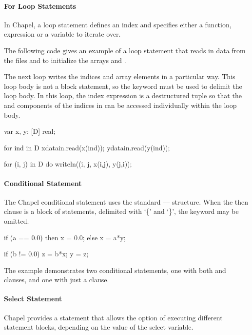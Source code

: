\paragraph{For Loop Statements} 
In Chapel, a  loop statement defines an index and
specifies either a function, expression or a variable to
iterate over. 

\begin{example}
The following code gives an example of a  loop
statement that reads in data from the files 
and  to initialize the arrays  and
.  

The next  loop writes the indices
and array elements in a particular way.  This  loop
body is not a block statement, so the keyword  must
be used to delimit the loop body.  In this loop, the index
expression is a destructured tuple so that the  and
 components of the indices in  can be accessed
individually within the loop body.    
\begin{chapel}

var x, y: [D] real;

for ind in D { 
  xdatain.read(x(ind));
  ydatain.read(y(ind));
}

for (i, j) in D do 
  writeln((i, j, x(i,j), y(j,i));

\end{chapel}
\end{example}

\paragraph{Conditional Statement} 
The Chapel conditional statement uses the standard
---- structure.  When
the then clause is a block of statements, delimited with
`\{' and `\}', the  keyword may be omitted.

\begin{example}
\begin{chapel}
if (a == 0.0) then 
  x = 0.0;
else 
  x = a*y;

if (b != 0.0) {
  z = b*x;
  y = z; 
}
\end{chapel}
The example demonstrates two conditional statements, one with
both  and  clauses, and one with just a
 clause.
\end{example}

\paragraph{Select Statement} 
Chapel provides a  statement that allows the option of
executing different statement blocks, depending on the value of the
select variable.

